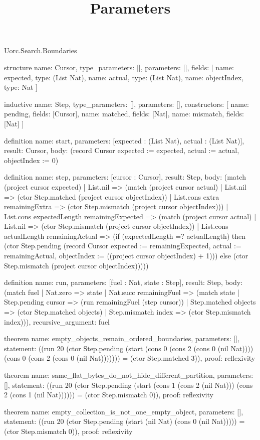 \begin{lexlean}{Uorc.Search.Boundaries}
\title{Parameters}
\begin{semanticmodule}
structure{
  name: Cursor,
  type_parameters: [],
  parameters: [],
  fields: [
    {name: expected, type: (List Nat)},
    {name: actual, type: (List Nat)},
    {name: objectIndex, type: Nat}
  ]
}

inductive{
  name: Step,
  type_parameters: [],
  parameters: [],
  constructors: [
    {name: pending, fields: [Cursor]},
    {name: matched, fields: [Nat]},
    {name: mismatch, fields: [Nat]}
  ]
}

definition{
  name: start,
  parameters: [expected : (List Nat), actual : (List Nat)],
  result: Cursor,
  body: (record Cursor {expected := expected, actual := actual, objectIndex := 0})
}

definition{
  name: step,
  parameters: [cursor : Cursor],
  result: Step,
  body: (match (project cursor expected)
    | List.nil => (match (project cursor actual)
      | List.nil => (ctor Step.matched (project cursor objectIndex))
      | List.cons extra remainingExtra => (ctor Step.mismatch (project cursor objectIndex)))
    | List.cons expectedLength remainingExpected => (match (project cursor actual)
      | List.nil => (ctor Step.mismatch (project cursor objectIndex))
      | List.cons actualLength remainingActual => (if (expectedLength =? actualLength) then (ctor Step.pending (record Cursor {expected := remainingExpected, actual := remainingActual, objectIndex := ((project cursor objectIndex) + 1)})) else (ctor Step.mismatch (project cursor objectIndex)))))
}

definition{
  name: run,
  parameters: [fuel : Nat, state : Step],
  result: Step,
  body: (match fuel
    | Nat.zero => state
    | Nat.succ remainingFuel => (match state
      | Step.pending cursor => (run remainingFuel (step cursor))
      | Step.matched objects => (ctor Step.matched objects)
      | Step.mismatch index => (ctor Step.mismatch index))),
  recursive_argument: fuel
}

theorem{
  name: empty_objects_remain_ordered_boundaries,
  parameters: [],
  statement: ((run 20 (ctor Step.pending (start (cons 0 (cons 2 (cons 0 (nil Nat)))) (cons 0 (cons 2 (cons 0 (nil Nat))))))) = (ctor Step.matched 3)),
  proof: reflexivity{}
}

theorem{
  name: same_flat_bytes_do_not_hide_different_partition,
  parameters: [],
  statement: ((run 20 (ctor Step.pending (start (cons 1 (cons 2 (nil Nat))) (cons 2 (cons 1 (nil Nat)))))) = (ctor Step.mismatch 0)),
  proof: reflexivity{}
}

theorem{
  name: empty_collection_is_not_one_empty_object,
  parameters: [],
  statement: ((run 20 (ctor Step.pending (start (nil Nat) (cons 0 (nil Nat))))) = (ctor Step.mismatch 0)),
  proof: reflexivity{}
}
\end{semanticmodule}
\end{lexlean}
